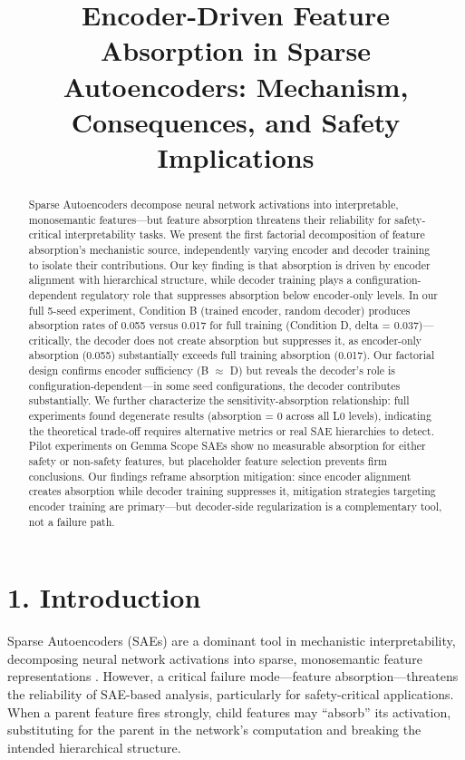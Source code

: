 \documentclass{article}
\title{Encoder-Driven Feature Absorption in Sparse Autoencoders: Mechanism, Consequences, and Safety Implications}
\begin{document}
\maketitle

\begin{abstract}
Sparse Autoencoders decompose neural network activations into interpretable, monosemantic features---but feature absorption threatens their reliability for safety-critical interpretability tasks. We present the first factorial decomposition of feature absorption's mechanistic source, independently varying encoder and decoder training to isolate their contributions. Our key finding is that absorption is driven by encoder alignment with hierarchical structure, while decoder training plays a configuration-dependent regulatory role that suppresses absorption below encoder-only levels. In our full 5-seed experiment, Condition B (trained encoder, random decoder) produces absorption rates of 0.055 versus 0.017 for full training (Condition D, delta = 0.037)---critically, the decoder does not create absorption but suppresses it, as encoder-only absorption (0.055) substantially exceeds full training absorption (0.017). Our factorial design confirms encoder sufficiency (B $\approx$ D) but reveals the decoder's role is configuration-dependent---in some seed configurations, the decoder contributes substantially. We further characterize the sensitivity-absorption relationship: full experiments found degenerate results (absorption = 0 across all L0 levels), indicating the theoretical trade-off requires alternative metrics or real SAE hierarchies to detect. Pilot experiments on Gemma Scope SAEs show no measurable absorption for either safety or non-safety features, but placeholder feature selection prevents firm conclusions. Our findings reframe absorption mitigation: since encoder alignment creates absorption while decoder training suppresses it, mitigation strategies targeting encoder training are primary---but decoder-side regularization is a complementary tool, not a failure path.
\end{abstract}

\section{1. Introduction}

Sparse Autoencoders (SAEs) are a dominant tool in mechanistic interpretability, decomposing neural network activations into sparse, monosemantic feature representations \citep{bricken2023towards}. However, a critical failure mode---feature absorption---threatens the reliability of SAE-based analysis, particularly for safety-critical applications. When a parent feature fires strongly, child features may ``absorb'' its activation, substituting for the parent in the network's computation and breaking the intended hierarchical structure.
\end{document}

